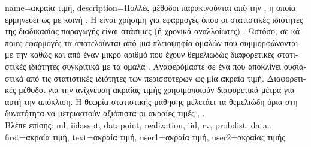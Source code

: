 {name={\foreignlanguage{greek}{ακραία τιμή}}, 
	description={\foreignlanguage{greek}{Πολλές μέθοδοι}   
		\foreignlanguage{greek}{παρακινούνται από την} , \foreignlanguage{greek}{η οποία ερμηνεύει} 
		 \foreignlanguage{greek}{ως}    
		\foreignlanguage{greek}{με κοινή} . \foreignlanguage{greek}{Η}  
		\foreignlanguage{greek}{είναι χρήσιμη για εφαρμογές όπου οι στατιστικές ιδιότητες της διαδικασίας παραγωγής} 
		 \foreignlanguage{greek}{είναι στάσιμες (ή χρονικά αναλλοίωτες)} \cite{Brockwell91}. 
		\foreignlanguage{greek}{Ωστόσο, σε κάποιες εφαρμογές τα}  \foreignlanguage{greek}{αποτελούνται 
		από μια πλειοψηφία ομαλών}  \foreignlanguage{greek}{που συμμορφώνονται με την} 
		 \foreignlanguage{greek}{καθώς και από έναν μικρό αριθμό}  
		\foreignlanguage{greek}{που έχουν θεμελιωδώς διαφορετικές στατιστικές ιδιότητες συγκριτικά με τα ομαλά}  
        		. \foreignlanguage{greek}{Αναφερόμαστε σε ένα}  \foreignlanguage{greek}{που  
        		αποκλίνει ουσιαστικά από τις στατιστικές ιδιότητες των περισσότερων}  \foreignlanguage{greek}{ως μία
		ακραία τιμή. Διαφορετικές μέθοδοι για την  ανίχνευση ακραίας τιμής χρησιμοποιούν διαφορετικά μέτρα για αυτή την 
		απόκλιση. Η θεωρία στατιστικής μάθησης μελετάει τα θεμελιώδη όρια στη δυνατότητα να μετριαστούν αξιόπιστα 
		οι ακραίες τιμές} \cite{doi:10.1137/0222052}, \cite{10.1214/20-AOS1961}.\\
       		\foreignlanguage{greek}{Βλέπε επίσης:} \gls{ml}, \gls{iidasspt}, \gls{datapoint}, \gls{realization}, \gls{iid}, \gls{rv}, \gls{probdist}, \gls{data}.},
	  first={\foreignlanguage{greek}{ακραία τιμή}}, 
	  text={\foreignlanguage{greek}{ακραία τιμή}},
	  user1={\foreignlanguage{greek}{ακραία τιμή}}, %
  	  user2={\foreignlanguage{greek}{ακραίας τιμής}} %
}

